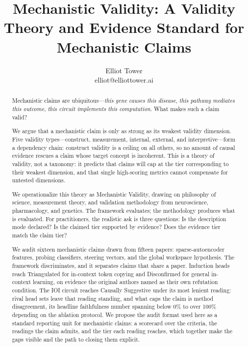 \documentclass{article}
\title{Mechanistic Validity: A Validity Theory and Evidence Standard for Mechanistic Claims}
\author{\name Elliot Tower \\
      \email elliot@elliottower.ai}
\begin{document}
\maketitle

\begin{abstract}
Mechanistic claims are ubiquitous---\emph{this gene causes this disease}, \emph{this pathway mediates this outcome}, \emph{this circuit implements this computation}. What makes such a claim valid?

We argue that a mechanistic claim is only as strong as its weakest validity dimension. Five validity types---construct, measurement, internal, external, and interpretive---form a dependency chain: construct validity is a ceiling on all others, so no amount of causal evidence rescues a claim whose target concept is incoherent. This is a theory of validity, not a taxonomy: it predicts that claims will cap at the tier corresponding to their weakest dimension, and that single high-scoring metrics cannot compensate for untested dimensions.

We operationalize this theory as Mechanistic Validity, drawing on philosophy of science, measurement theory, and validation methodology from neuroscience, pharmacology, and genetics. The framework evaluates; the methodology produces what is evaluated. For practitioners, the realistic ask is three questions: Is the description mode declared? Is the claimed tier supported by evidence? Does the evidence tier match the claim tier?

We audit sixteen mechanistic claims drawn from fifteen papers: sparse-autoencoder features, probing classifiers, steering vectors, and the global workspace hypothesis. The framework discriminates, and it separates claims that share a paper. Induction heads reach Triangulated for in-context token copying and Disconfirmed for general in-context learning, on evidence the original authors named as their own refutation condition. The IOI circuit reaches Causally Suggestive under its most lenient reading: rival head sets leave that reading standing, and what caps the claim is method disagreement, its headline faithfulness number spanning below 0\% to over 100\% depending on the ablation protocol. We propose the audit format used here as a standard reporting unit for mechanistic claims: a scorecard over the criteria, the readings the claim admits, and the tier each reading reaches, which together make the gaps visible and the path to closing them explicit.
\end{abstract}
\end{document}
